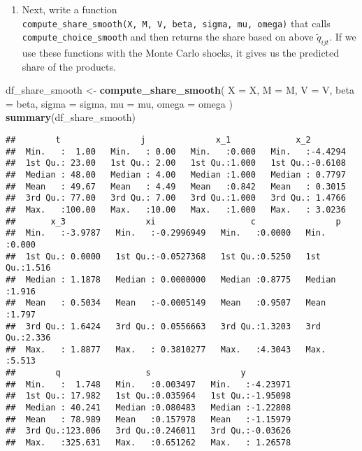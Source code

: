 \documentclass[
]{book}
\newenvironment{Shaded}{\begin{snugshade}}{\end{snugshade}}
\newcommand{\AttributeTok}[1]{\textcolor[rgb]{0.13,0.29,0.53}{#1}}
\newcommand{\FunctionTok}[1]{\textcolor[rgb]{0.13,0.29,0.53}{\textbf{#1}}}
\newcommand{\NormalTok}[1]{#1}
\newcommand{\OtherTok}[1]{\textcolor[rgb]{0.56,0.35,0.01}{#1}}
\providecommand{\tightlist}{%
  \setlength{\itemsep}{0pt}\setlength{\parskip}{0pt}}
\begin{document}
\begin{enumerate}
\def\labelenumi{\arabic{enumi}.}
\setcounter{enumi}{8}
\tightlist
\item
  Next, write a function \texttt{compute\_share\_smooth(X,\ M,\ V,\ beta,\ sigma,\ mu,\ omega)} that calls \texttt{compute\_choice\_smooth} and then returns the share based on above \(\tilde{q}_{ijt}\). If we use these functions with the Monte Carlo shocks, it gives us the predicted share of the products.
\end{enumerate}

\begin{Shaded}
\begin{Highlighting}[]
\NormalTok{df\_share\_smooth }\OtherTok{\textless{}{-}} 
  \FunctionTok{compute\_share\_smooth}\NormalTok{(}
    \AttributeTok{X =}\NormalTok{ X, }
    \AttributeTok{M =}\NormalTok{ M, }
    \AttributeTok{V =}\NormalTok{ V, }
    \AttributeTok{beta =}\NormalTok{ beta, }
    \AttributeTok{sigma =}\NormalTok{ sigma, }
    \AttributeTok{mu =}\NormalTok{ mu, }
    \AttributeTok{omega =}\NormalTok{ omega}
\NormalTok{    )}
\FunctionTok{summary}\NormalTok{(df\_share\_smooth)}
\end{Highlighting}
\end{Shaded}

\begin{verbatim}
##        t                j              x_1             x_2         
##  Min.   :  1.00   Min.   : 0.00   Min.   :0.000   Min.   :-4.4294  
##  1st Qu.: 23.00   1st Qu.: 2.00   1st Qu.:1.000   1st Qu.:-0.6108  
##  Median : 48.00   Median : 4.00   Median :1.000   Median : 0.7797  
##  Mean   : 49.67   Mean   : 4.49   Mean   :0.842   Mean   : 0.3015  
##  3rd Qu.: 77.00   3rd Qu.: 7.00   3rd Qu.:1.000   3rd Qu.: 1.4766  
##  Max.   :100.00   Max.   :10.00   Max.   :1.000   Max.   : 3.0236  
##       x_3                xi                   c                p        
##  Min.   :-3.9787   Min.   :-0.2996949   Min.   :0.0000   Min.   :0.000  
##  1st Qu.: 0.0000   1st Qu.:-0.0527368   1st Qu.:0.5250   1st Qu.:1.516  
##  Median : 1.1878   Median : 0.0000000   Median :0.8775   Median :1.916  
##  Mean   : 0.5034   Mean   :-0.0005149   Mean   :0.9507   Mean   :1.797  
##  3rd Qu.: 1.6424   3rd Qu.: 0.0556663   3rd Qu.:1.3203   3rd Qu.:2.336  
##  Max.   : 1.8877   Max.   : 0.3810277   Max.   :4.3043   Max.   :5.513  
##        q                 s                  y           
##  Min.   :  1.748   Min.   :0.003497   Min.   :-4.23971  
##  1st Qu.: 17.982   1st Qu.:0.035964   1st Qu.:-1.95098  
##  Median : 40.241   Median :0.080483   Median :-1.22808  
##  Mean   : 78.989   Mean   :0.157978   Mean   :-1.15979  
##  3rd Qu.:123.006   3rd Qu.:0.246011   3rd Qu.:-0.03626  
##  Max.   :325.631   Max.   :0.651262   Max.   : 1.26578
\end{verbatim}
\end{document}
